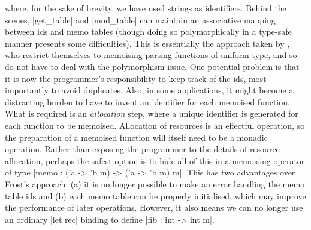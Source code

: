 where, for the sake of brevity, we have used strings as identifiers. Behind
the scenes, |get_table| and |mod_table| can maintain an associative mapping 
between ids and memo tables (though doing so polymorphically
in a type-safe manner presents some difficulties).
This is essentially the approach taken by \citet{Frost2003}, who restrict
themselves to memoising parsing functions of uniform type, and so do
not have to deal with the polymorphism issue.
One potential problem is that it is now the programmer's
responsibility to keep track of the ids, most importantly to avoid
duplicates. Also, in some applications, it might become a distracting burden to have
to invent an identifier for each memoised function. What is required is an
\emph{allocation} step, where a unique identifier is generated for each function
to be memoised. Allocation of resources is an effectful operation, so the preparation
of a memoised function will itself need to be a monadic operation. Rather than
exposing the programmer to the details of resource allocation, perhaps the
safest option is to hide all of this in a memoising operator of type
|memo : ('a -> 'b m) -> ('a -> 'b m) m|.
This has two advantages over Frost's approach: (a) it is no longer possible to make 
an error handling the memo table ids and (b) each memo table can be properly
initialised, which may improve the performance of later operations. However, 
it also means we can no longer use an ordinary |let rec| binding to define 
|fib : int -> int m|.

